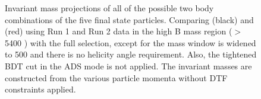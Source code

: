 \begin{figure}
\hfill
{}
\caption{Invariant mass projections of all of the possible two body combinations of the five final state particles. Comparing \decay{\Dz}{\Km\pip} (black) and \decay{\Dz}{\Kp\pim} (red) using Run 1 and Run 2 data in the high B mass region ($>$ 5400 \mevcc) with the full selection, except for the \Kstar mass window is widened to 500 \mev and there is no \KS helicity angle requirement. Also, the tightened BDT cut in the ADS mode is not applied. The invariant masses are constructed from the various particle momenta without DTF constraints applied.}
\label{projections2bodynodtf}
\end{figure}

